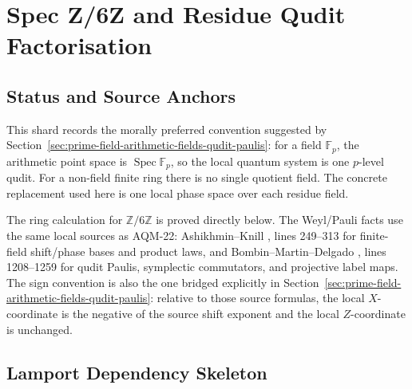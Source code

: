 
\section{Spec Z/6Z and Residue Qudit Factorisation}
\label{sec:spec-z6-residue-qudit-factorisation}

\subsection{Status and Source Anchors}

This shard records the morally preferred convention suggested by
Section~\ref{sec:prime-field-arithmetic-fields-qudit-paulis}: for a field
\(\mathbb F_p\), the arithmetic point space is \(\operatorname{Spec}\mathbb F_p\),
so the local quantum system is one \(p\)-level qudit.  For a non-field finite
ring there is no single quotient field.  The concrete replacement used here is
one local phase space over each residue field.

The ring calculation for \(\mathbb Z/6\mathbb Z\) is proved directly below.
The Weyl/Pauli facts use the same local sources as AQM-22: Ashikhmin--Knill
,
lines 249--313 for finite-field shift/phase bases and product laws, and
Bombin--Martin--Delgado
,
lines 1208--1259 for qudit Paulis, symplectic commutators, and projective
label maps.  The sign convention is also the one bridged explicitly in
Section~\ref{sec:prime-field-arithmetic-fields-qudit-paulis}: relative to
those source formulas, the local \(X\)-coordinate is the negative of the
source shift exponent and the local \(Z\)-coordinate is unchanged.

\subsection{Lamport Dependency Skeleton}

